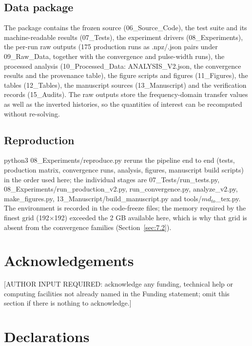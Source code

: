 \documentclass[preprint,12pt]{elsarticle}
\begin{document}
\subsection{Data package}
\label{sec:9.2}

The package contains the frozen source (06\_Source\_Code), the test suite and its machine-readable results (07\_Tests), the experiment drivers (08\_Experiments), the per-run raw outputs (175 production runs as .npz/.json pairs under 09\_Raw\_Data, together with the convergence and pulse-width runs), the processed analysis (10\_Processed\_Data: ANALYSIS\_V2.json, the convergence results and the provenance table), the figure scripts and figures (11\_Figures), the tables (12\_Tables), the manuscript sources (13\_Manuscript) and the verification records (15\_Audits). The raw outputs store the frequency-domain transfer values as well as the inverted histories, so the quantities of interest can be recomputed without re-solving.

\subsection{Reproduction}
\label{sec:9.3}

python3 08\_Experiments/reproduce.py reruns the pipeline end to end (tests, production matrix, convergence runs, analysis, figures, manuscript build scripts) in the order used here; the individual stages are 07\_Tests/run\_tests.py, 08\_Experiments/run\_production\_v2.py, run\_convergence.py, analyze\_v2.py, make\_figures.py, 13\_Manuscript/build\_manuscript.py and tools/$md_{to}$\_tex.py. The environment is recorded in the code-freeze files; the memory required by the finest grid (192$\times$192) exceeded the 2 GB available here, which is why that grid is absent from the convergence families (Section~\ref{sec:7.2}).

\section*{Acknowledgements}

[AUTHOR INPUT REQUIRED: acknowledge any funding, technical help or computing facilities not already named in the Funding statement; omit this section if there is nothing to acknowledge.]

\section*{Declarations}
\end{document}
